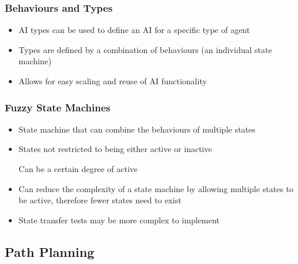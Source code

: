 \documentclass[a4paper]{article}
\begin{document}
\subsubsection{Behaviours and Types}

\begin{itemize}
  \item
    AI types can be used to define an AI for a specific type of agent

  \item
    Types are defined by a combination of behaviours (an individual state
    machine)

  \item
    Allows for easy scaling and reuse of AI functionality

\end{itemize}

\subsubsection{Fuzzy State Machines}

\begin{itemize}
  \item
    State machine that can combine the behaviours of multiple states

  \item
    States not restricted to being either active or inactive

    Can be a certain degree of active

  \item
    Can reduce the complexity of a state machine by allowing multiple states to
    be active, therefore fewer states need to exist

  \item
    State transfer tests may be more complex to implement

\end{itemize}

\subsection{Path Planning}
\end{document}
